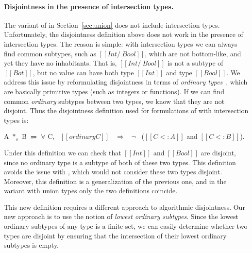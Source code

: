 \paragraph{Disjointness in the presence of intersection types.}
The variant of \cal in Section~\ref{sec:union} does not include intersection types.
Unfortunately, the disjointness definition above does not work in the presence of
intersection types. The reason is simple: with intersection types we can always find
common subtypes, such as $[[Int /\ Bool]]$, which are not bottom-like, and yet
they have no inhabitants. That is,
$[[Int /\ Bool]]$ is not a subtype of $[[Bot]]$, but no value can have both type
$[[Int]]$ and type $[[Bool]]$.
We address this issue by reformulating
disjointness in terms of \textit{ordinary types}~\cite{davies2000intersection}, which are basically primitive types
(such as integers or functions).
If we can find common \emph{ordinary} subtypes between two types, we know that they
are not disjoint.
Thus the disjointness definition used for formulations
of \name with intersection types is:

\begin{definition}
\label{def:over:disj}
  A $*_s$ B $\Coloneqq$ $\forall$ C, \ $[[ordinary C]]$ \ $\Longrightarrow$ \ $\neg$ \ ($[[C <: A]]$ and $[[C <: B]]$).
\end{definition}

\begin{comment}
\snow{Following is an alternative definition. Would it looks simpler?}

\begin{definition}
\label{def:inter:disj}
  A $*_s$ B $\Coloneqq$ $\forall$ C, \ $\neg$ ($[[ordinary C]]$ and $[[C <: A]]$ and $[[C <: B]]$).
\end{definition}
\end{comment}

\noindent Under this definition we can check that $[[Int]]$ and $[[Bool]]$ are disjoint,
since no ordinary type is a subtype of both of these two types. This definition avoids
the issue with , which would not consider these two types disjoint.
Moreover, this definition is a generalization of the previous one, and in the
variant with union types only the two definitions coincide.

This new definition requires a different approach to algorithmic disjointness. Our new
approach is to use the notion of \emph{lowest ordinary subtypes}. Since the lowest ordinary
subtypes of any type is a finite set, we can easily determine whether two types are disjoint
by ensuring that the intersection of their lowest ordinary subtypes is empty.

